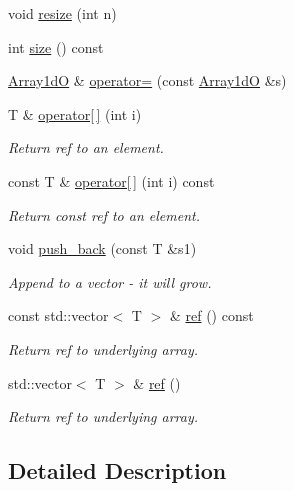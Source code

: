 \begin{DoxyCompactItemize}
void \mbox{\hyperlink{classADAT_1_1Array1dO_afc98b7076e43428faae90d7cb1dab3bf}{resize}} (int n)
\item 
int \mbox{\hyperlink{classADAT_1_1Array1dO_a749307d8e42867d6fac39dc9aca84978}{size}} () const
\item 
\mbox{\hyperlink{classADAT_1_1Array1dO}{Array1dO}} \& \mbox{\hyperlink{classADAT_1_1Array1dO_a387ca64e93f23d140b38bd42e81d05a8}{operator=}} (const \mbox{\hyperlink{classADAT_1_1Array1dO}{Array1dO}} \&s)
\item 
T \& \mbox{\hyperlink{classADAT_1_1Array1dO_a3ec54ce2ab12d922d155e37d1f63a010}{operator\mbox{[}$\,$\mbox{]}}} (int i)
\begin{DoxyCompactList}\small\item\em Return ref to an element. \end{DoxyCompactList}\item 
const T \& \mbox{\hyperlink{classADAT_1_1Array1dO_a48b2dbd0a7e4ee5dce18a12ca19d78be}{operator\mbox{[}$\,$\mbox{]}}} (int i) const
\begin{DoxyCompactList}\small\item\em Return const ref to an element. \end{DoxyCompactList}\item 
void \mbox{\hyperlink{classADAT_1_1Array1dO_a6e326e7686f842918f3cbda5c6a4b05f}{push\+\_\+back}} (const T \&s1)
\begin{DoxyCompactList}\small\item\em Append to a vector -\/ it will grow. \end{DoxyCompactList}\item 
const std\+::vector$<$ T $>$ \& \mbox{\hyperlink{classADAT_1_1Array1dO_a3b74880db3b0d48e29fb28f80a283352}{ref}} () const
\begin{DoxyCompactList}\small\item\em Return ref to underlying array. \end{DoxyCompactList}\item 
std\+::vector$<$ T $>$ \& \mbox{\hyperlink{classADAT_1_1Array1dO_ac3ff9b35bef8e7fa276136673b907749}{ref}} ()
\begin{DoxyCompactList}\small\item\em Return ref to underlying array. \end{DoxyCompactList}\end{DoxyCompactItemize}


\subsection{Detailed Description}
